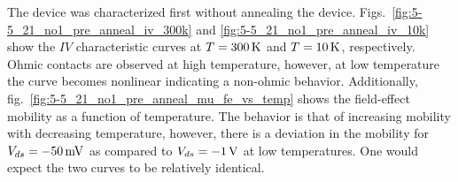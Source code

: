 The device was characterized first without annealing the device. Figs.~\ref{fig:5-5_21_no1_pre_anneal_iv_300k} and \ref{fig:5-5_21_no1_pre_anneal_iv_10k} show the $IV$ characteristic curves at $T=300\,\mathrm{K}$ and $T=10\,\mathrm{K}$, respectively. Ohmic contacts are observed at high temperature, however, at low temperature the curve becomes nonlinear indicating a non-ohmic behavior. Additionally, fig.~\ref{fig:5-5_21_no1_pre_anneal_mu_fe_vs_temp} shows the field-effect mobility as a function of temperature. The behavior is that of increasing mobility with decreasing temperature, however, there is a deviation in the mobility for $V_{ds} = -50\,\mathrm{mV}$ as compared to $V_{ds} = -1\,\mathrm{V}$ at low temperatures. One would expect the two curves to be relatively identical. 
\begin{figure}[ht]
	\centering 
\end{figure}
